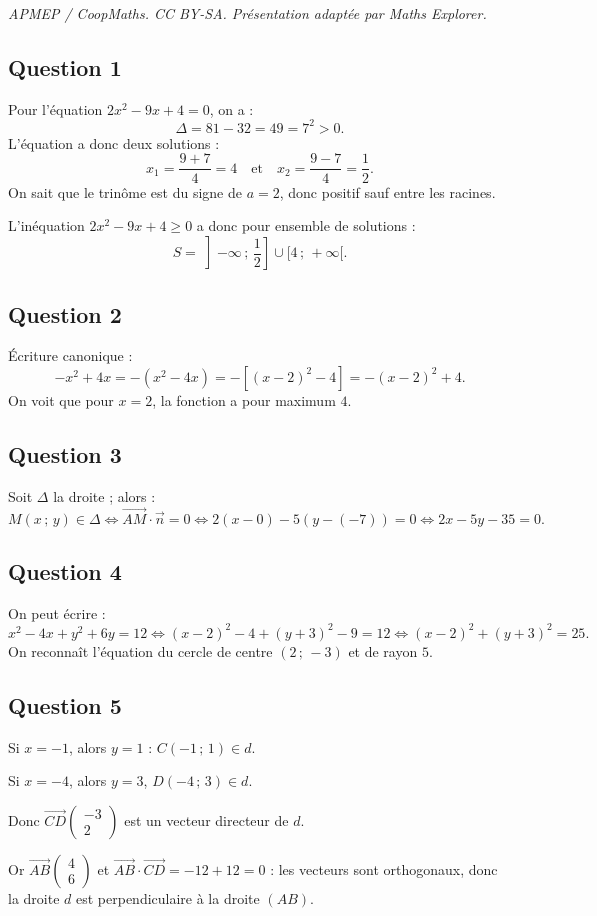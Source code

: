\documentclass[10pt]{article}
\begin{document}
\noindent\textit{APMEP / CoopMaths. CC BY-SA. Présentation adaptée par Maths Explorer.}\par\medskip
\subsection*{Question 1}

Pour l'équation \(2x^2 - 9x + 4 = 0\), on a :
\[
\Delta = 81 - 32 = 49 = 7^2 > 0.
\]
L'équation a donc deux solutions :
\[
x_1 = \dfrac{9 + 7}{4} = 4 \quad \text{et} \quad x_2 = \dfrac{9 - 7}{4} = \dfrac{1}{2}.
\]
On sait que le trinôme est du signe de \(a = 2\), donc positif sauf entre les racines.

L'inéquation \(2x^2 - 9x + 4 \geqslant 0\) a donc pour ensemble de solutions :
\[
S = \left] -\infty\,;\,\dfrac{1}{2} \right] \cup [4\,;\,+\infty[.
\]

\subsection*{Question 2}

Écriture canonique :
\[
-x^2 + 4x = -(x^2 - 4x) = -[(x - 2)^2 - 4] = -(x - 2)^2 + 4.
\]
On voit que pour \(x = 2\), la fonction a pour maximum \(4\).

\subsection*{Question 3}

Soit \(\Delta\) la droite ; alors :
\[
M(x\,;\,y) \in \Delta \Longleftrightarrow \overrightarrow{AM} \cdot \vec{n} = 0 \Longleftrightarrow 2(x - 0) - 5(y - (-7)) = 0 \Longleftrightarrow 2x - 5y - 35 = 0.
\]

\subsection*{Question 4}

On peut écrire :
\[
x^2 - 4x + y^2 + 6y = 12 \Longleftrightarrow (x - 2)^2 - 4 + (y + 3)^2 - 9 = 12 \Longleftrightarrow (x - 2)^2 + (y + 3)^2 = 25.
\]
On reconnaît l'équation du cercle de centre \((2\,;\,-3)\) et de rayon \(5\).

\subsection*{Question 5}

Si \(x = -1\), alors \(y = 1\) : \(C(-1\,;\,1) \in d\).

Si \(x = -4\), alors \(y = 3\), \(D(-4\,;\,3) \in d\).

Donc \(\overrightarrow{CD} \begin{pmatrix} -3 \\ 2 \end{pmatrix}\) est un vecteur directeur de \(d\).

Or \(\overrightarrow{AB} \begin{pmatrix} 4 \\ 6 \end{pmatrix}\) et \(\overrightarrow{AB} \cdot \overrightarrow{CD} = -12 + 12 = 0\) : les vecteurs sont orthogonaux, donc la droite \(d\) est perpendiculaire à la droite \((AB)\).
\end{document}
